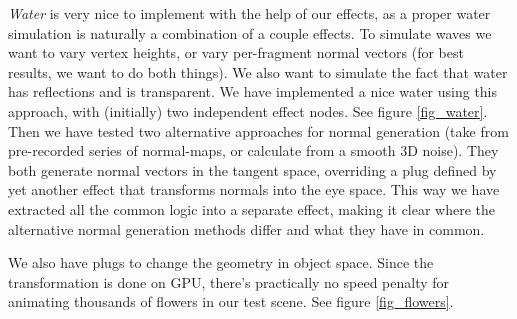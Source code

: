 \documentclass{egpubl}
\begin{document}
\emph{Water} is very nice to implement with the help of our effects,
as a proper water simulation
is naturally a combination of a couple effects.
To simulate waves we want to vary vertex
heights, or vary per-fragment normal vectors (for best results,
we want to do both things).
We also want to simulate the fact that water has reflections and
is transparent. We have implemented a nice water using this approach,
with (initially) two independent effect nodes. See figure \ref{fig_water}.
Then we have tested two alternative
approaches for normal generation (take from pre-recorded series of normal-maps,
or calculate from a smooth 3D noise). They both generate normal
vectors in the tangent space, overriding a plug defined by yet another effect
that transforms normals into the eye space.
This way we have extracted all the common logic into a separate effect,
making it clear where the alternative normal generation methods differ
and what they have in common.



We also have plugs to change the geometry in object space.
Since the transformation is done on GPU, there's practically
no speed penalty for animating thousands of flowers in our test scene.
See figure \ref{fig_flowers}.
\end{document}
